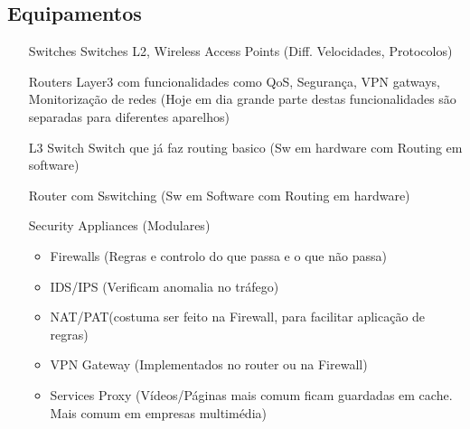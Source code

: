 \documentclass{easyclass}
\begin{document}
\subsection{Equipamentos}
\begin{itemize}
    \item [Switches] Switches L2, Wireless Access Points (Diff. Velocidades, Protocolos)
    \item [Routers] Layer3 com funcionalidades como QoS, Segurança, VPN gatways, Monitorização de redes (Hoje em dia grande parte destas funcionalidades são separadas para diferentes aparelhos)
    \item [L3 Switch] Switch que já faz routing basico (Sw em hardware com Routing em software)
    \item [Router com Sswitching] (Sw em Software com Routing em hardware)
    \item [Security Appliances (Modulares)] 
    \begin{itemize}
        \item Firewalls (Regras e controlo do que passa e o que não passa)
        \item IDS/IPS (Verificam anomalia no tráfego)
        \item NAT/PAT(costuma ser feito na Firewall, para facilitar aplicação de regras)
        \item VPN Gateway (Implementados no router ou na Firewall)
        \item Services Proxy (Vídeos/Páginas mais comum ficam guardadas em cache.  Mais comum em empresas multimédia)
    \end{itemize}
    
\end{itemize}
\end{document}
